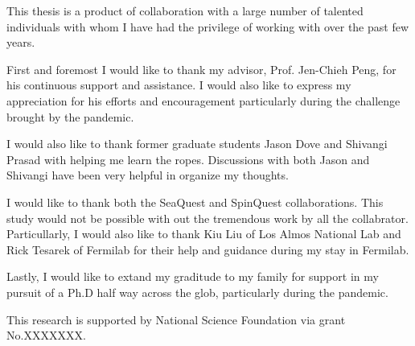 \begin{acknowledgments}
This thesis is a product of collaboration with a large number of talented 
individuals with whom I have had the privilege of working with over the past 
few years.

First and foremost I would like to thank my advisor, Prof. Jen-Chieh Peng, for 
his continuous support and assistance. I would also like to express my 
appreciation for his efforts and encouragement particularly during the 
challenge brought by the pandemic. 

I would also like to thank former graduate students Jason Dove and Shivangi 
Prasad with helping me learn the ropes. Discussions with both Jason and 
Shivangi have been very helpful in organize my thoughts.

I would like to thank both the SeaQuest and SpinQuest collaborations. 
This study would not be possible with out the tremendous work by all the 
collabrator. Particullarly, I would also like to thank Kiu Liu of Los Almos 
National Lab and Rick Tesarek of Fermilab for their help and guidance during my
stay in Fermilab.

Lastly, I would like to extand my graditude to my family for support in my 
pursuit of a Ph.D half way across the glob, particularly during the pandemic. 

This research is supported by National Science Foundation via grant No.XXXXXXX.

\end{acknowledgments}

